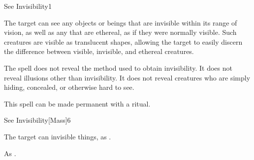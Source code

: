 \begin{spellsection}{See Invisibility}{1}
    \begin{spellheader}
    \end{spellheader}
    \begin{spellcontent}
        \begin{spelltargetinginfo}
        \end{spelltargetinginfo}
        \begin{spelleffects}
            \spelleffect The target can see any objects or beings that are invisible within its range of vision, as well as any that are ethereal, as if they were normally visible. Such creatures are visible as translucent shapes, allowing the target to easily discern the difference between visible, invisible, and ethereal creatures.
            \spelldur \durpersonallong
        \end{spelleffects}
    \end{spellcontent}
    \begin{spellfooter}
        \spellnotes The spell does not reveal the method used to obtain invisibility. It does not reveal illusions other than invisibility. It does not reveal creatures who are simply hiding, concealed, or otherwise hard to see.

        This spell can be made permanent with a  ritual.
        \miscastexplode
    \end{spellfooter}
\end{spellsection}

\begin{spellsection}{See Invisibility}[Mass]{6}
    \begin{spellheader}
    \end{spellheader}
    \begin{spellcontent}
        \begin{spelltargetinginfo}
        \end{spelltargetinginfo}
        \begin{spelleffects}
            \spelleffect The target can invisible things, as .
            \spelldur \durlong
        \end{spelleffects}
    \end{spellcontent}
    \begin{spellfooter}
        \spellnotes As .
        \miscastexplode
    \end{spellfooter}
\end{spellsection}

